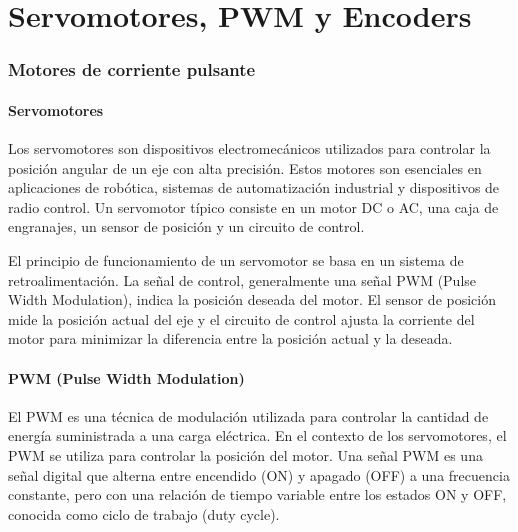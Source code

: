 \documentclass[../main]{subfiles}
\begin{document}
\chapter{Servomotores, PWM y Encoders}

\subsection*{Motores de corriente pulsante}

\subsubsection*{Servomotores}
Los servomotores son dispositivos electromecánicos utilizados para controlar la posición angular de un eje con alta precisión. Estos motores son esenciales en aplicaciones de robótica, sistemas de automatización industrial y dispositivos de radio control. Un servomotor típico consiste en un motor DC o AC, una caja de engranajes, un sensor de posición y un circuito de control.

El principio de funcionamiento de un servomotor se basa en un sistema de retroalimentación. La señal de control, generalmente una señal PWM (Pulse Width Modulation), indica la posición deseada del motor. El sensor de posición mide la posición actual del eje y el circuito de control ajusta la corriente del motor para minimizar la diferencia entre la posición actual y la deseada.


\subsubsection*{PWM (Pulse Width Modulation)}
El PWM es una técnica de modulación utilizada para controlar la cantidad de energía suministrada a una carga eléctrica. En el contexto de los servomotores, el PWM se utiliza para controlar la posición del motor. Una señal PWM es una señal digital que alterna entre encendido (ON) y apagado (OFF) a una frecuencia constante, pero con una relación de tiempo variable entre los estados ON y OFF, conocida como ciclo de trabajo (duty cycle).
\end{document}

